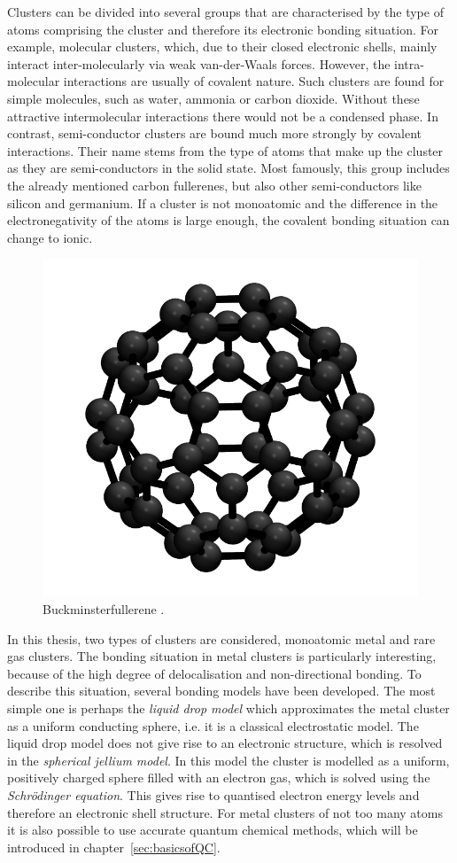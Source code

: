 Clusters can be divided into several groups that are characterised by the type
of atoms comprising the cluster and therefore its electronic bonding situation.
For example, molecular clusters, which, due to their closed electronic shells,
mainly interact inter-molecularly via weak van-der-Waals forces. However, the
intra-molecular interactions are usually of covalent nature. Such clusters are
found for simple molecules, such as water,\autocite{Liu_WaterClusters_1996}
ammonia\autocite{Beu_Structureammoniaclusters_2001} or carbon
dioxide.\autocite{Takeuchi_GeometryOptimizationCarbon_2008} 
Without these attractive intermolecular interactions there would not be
a condensed phase. In contrast,
semi-conductor clusters are bound much more strongly by covalent interactions.
Their name stems from the type of atoms that make up the cluster as they are
semi-conductors in the solid state. Most famously, this group includes the
already mentioned carbon
fullerenes\autocite{Kroto_C60Buckminsterfullerene_1985}, but also other
semi-conductors like silicon\autocite{Zhu_Structuresstabilitiessmall_2003a} and
germanium.\autocite{Pacchioni_Silicongermaniumclusters_1986} If a cluster is not
monoatomic and the difference in the electronegativity of the atoms is large
enough, the covalent bonding situation can change to ionic.

\begin{figure}[htb]
    \centering
    \includegraphics[width=.5\textwidth]{golddual/C60Ih.png}
    \caption{Buckminsterfullerene .}
    \label{fig:C60example}
\end{figure}

In this thesis, two types of clusters are considered, monoatomic metal
and rare gas clusters. The bonding situation in metal clusters is particularly
interesting, because of the high degree of delocalisation and non-directional
bonding. To describe this situation, several bonding models have been developed.
The most simple one is perhaps the \emph{liquid drop model} which approximates
the metal cluster as a uniform conducting sphere, i.e. it is a classical
electrostatic model. The liquid drop model does not give rise to an electronic
structure, which is resolved in the \textit{spherical jellium model}. In this
model the cluster is modelled as a uniform, positively charged sphere filled
with an electron gas, which is solved using the \textit{Schr\"odinger equation}.
This gives rise to quantised electron energy levels and therefore an electronic
shell structure. For metal clusters of not too many atoms it is also possible to
use accurate quantum chemical methods, which will be introduced in
chapter~\ref{sec:basicsofQC}.

